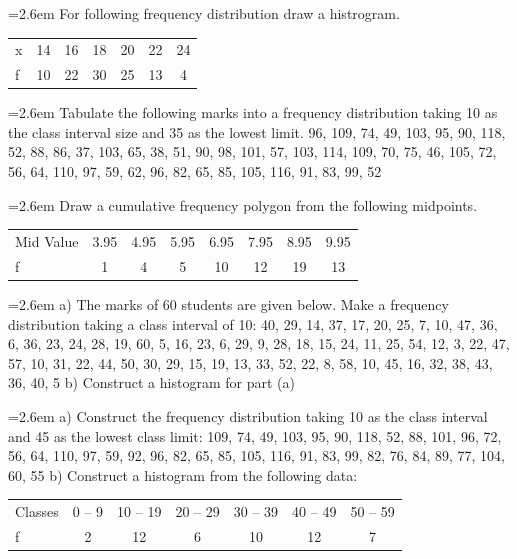 \documentclass[11pt,a4paper]{article}
\newcommand{\Q}[2]{\par\smallskip\noindent\hangindent=2.6em\hangafter=1
  \makebox[2.6em][l]{\textbf{#1.}}#2\par}
\newcommand{\dtab}[2]{\par\smallskip\noindent\hspace*{2.6em}\begin{tabular}{#1}\hline #2\\ \hline\end{tabular}\par\smallskip}
\begin{document}
\Q{32}{For following frequency distribution draw a histrogram.\dtab{|l@{\hspace{2.5em}}c@{\hspace{2.5em}}c@{\hspace{2.5em}}c@{\hspace{2.5em}}c@{\hspace{2.5em}}c@{\hspace{2.5em}}c|}{x & 14 & 16 & 18 & 20 & 22 & 24 \\ f & 10 & 22 & 30 & 25 & 13 & 4}}
\Q{33}{Tabulate the following marks into a frequency distribution taking 10 as the class interval size and 35 as the lowest limit. 96, 109, 74, 49, 103, 95, 90, 118, 52, 88, 86, 37, 103, 65, 38, 51, 90, 98, 101, 57, 103, 114, 109, 70, 75, 46, 105, 72, 56, 64, 110, 97, 59, 62, 96, 82, 65, 85, 105, 116, 91, 83, 99, 52}
\Q{34}{Draw a cumulative frequency polygon from the following midpoints.\dtab{|l@{\hspace{1.8em}}c@{\hspace{1.8em}}c@{\hspace{1.8em}}c@{\hspace{1.8em}}c@{\hspace{1.8em}}c@{\hspace{1.8em}}c@{\hspace{1.8em}}c|}{Mid Value & 3.95 & 4.95 & 5.95 & 6.95 & 7.95 & 8.95 & 9.95 \\ f & 1 & 4 & 5 & 10 & 12 & 19 & 13}}
\Q{35}{a) The marks of 60 students are given below. Make a frequency distribution taking a class interval of 10: 40, 29, 14, 37, 17, 20, 25, 7, 10, 47, 36, 6, 36, 23, 24, 28, 19, 60, 5, 16, 23, 6, 29, 9, 28, 18, 15, 24, 11, 25, 54, 12, 3, 22, 47, 57, 10, 31, 22, 44, 50, 30, 29, 15, 19, 13, 33, 52, 22, 8, 58, 10, 45, 16, 32, 38, 43, 36, 40, 5 b) Construct a histogram for part (a)}
\Q{36}{a) Construct the frequency distribution taking 10 as the class interval and 45 as the lowest class limit: 109, 74, 49, 103, 95, 90, 118, 52, 88, 101, 96, 72, 56, 64, 110, 97, 59, 92, 96, 82, 65, 85, 105, 116, 91, 83, 99, 82, 76, 84, 89, 77, 104, 60, 55 b) Construct a histogram from the following data:\dtab{|l@{\hspace{1.8em}}c@{\hspace{1.8em}}c@{\hspace{1.8em}}c@{\hspace{1.8em}}c@{\hspace{1.8em}}c@{\hspace{1.8em}}c|}{Classes & 0 -- 9 & 10 -- 19 & 20 -- 29 & 30 -- 39 & 40 -- 49 & 50 -- 59 \\ f & 2 & 12 & 6 & 10 & 12 & 7}}
\end{document}
